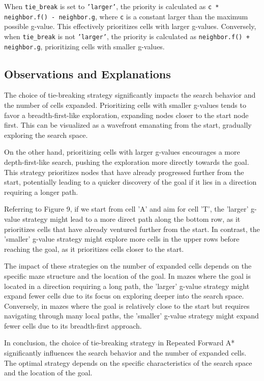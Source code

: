 \documentclass[12pt]{article}
\begin{document}
When \texttt{tie\_break} is set to \texttt{'larger'}, 
the priority is calculated as  \texttt{c * neighbor.f() - neighbor.g}, 
where \texttt{c} is a constant larger than the maximum possible g-value. 
This effectively prioritizes cells with larger g-values. 
Conversely, 
when \texttt{tie\_break} is not \texttt{'larger'}, 
the priority is calculated as \texttt{neighbor.f() + neighbor.g}, 
prioritizing cells with smaller g-values.

\subsection{Observations and Explanations}

The choice of tie-breaking strategy significantly impacts the search behavior and the number of cells expanded. 
Prioritizing cells with smaller g-values tends to favor a breadth-first-like exploration, 
expanding nodes closer to the start node first. 
This can be visualized as a wavefront emanating from the start, 
gradually exploring the search space.

On the other hand, prioritizing cells with larger g-values encourages a more depth-first-like search, 
pushing the exploration more directly towards the goal. 
This strategy prioritizes nodes that have already progressed further from the start, 
potentially leading to a quicker discovery of the goal if it lies in a direction requiring a longer path.

Referring to Figure 9, 
if we start from cell 'A' and aim for cell 'T', 
the 'larger' g-value strategy might lead to a more direct path along the bottom row, 
as it prioritizes cells that have already ventured further from the start. 
In contrast, 
the 'smaller' g-value strategy might explore more cells in the upper rows before reaching the goal, 
as it prioritizes cells closer to the start.

The impact of these strategies on the number of expanded cells depends on the specific maze structure and the location of the goal. 
In mazes where the goal is located in a direction requiring a long path, 
the 'larger' g-value strategy might expand fewer cells due to its focus on exploring deeper into the search space. 
Conversely, 
in mazes where the goal is relatively close to the start but requires navigating through many local paths, 
the 'smaller' g-value strategy might expand fewer cells due to its breadth-first approach.

In conclusion, 
the choice of tie-breaking strategy in Repeated Forward A* significantly influences the search behavior and the number of expanded cells. 
The optimal strategy depends on the specific characteristics of the search space and the location of the goal.
\end{document}
